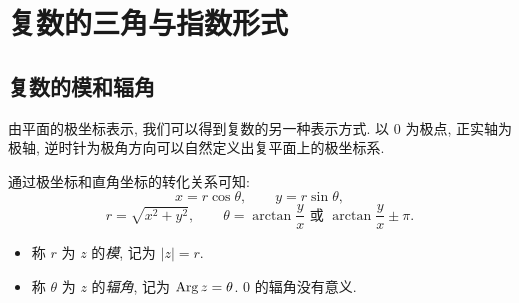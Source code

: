\section{复数的三角与指数形式}

\subsection{复数的模和辐角}

由平面的极坐标表示, 我们可以得到复数的另一种表示方式.
以 $0$ 为极点, 正实轴为极轴, 逆时针为极角方向可以自然定义出复平面上的极坐标系.

通过极坐标和直角坐标的转化关系可知:
\[ x=r\cos\theta,\qquad y=r\sin\theta,\]
\[r=\sqrt{x^2+y^2},\qquad \theta=\arctan\dfrac yx\text{ 或 }\arctan\dfrac yx\pm\pi.\]

\begin{definition}
  \begin{itemize}
    \item 称 $r$ 为 $z$ 的\emph{模}, 记为 \emph{$|z|=r$}.
    \item 称 $\theta$ 为 $z$ 的\emph{辐角}, 记为 \emph{$\operatorname{Arg} z=\theta$}.
    \alert{$0$ 的辐角没有意义}.
  \end{itemize}
\end{definition}


